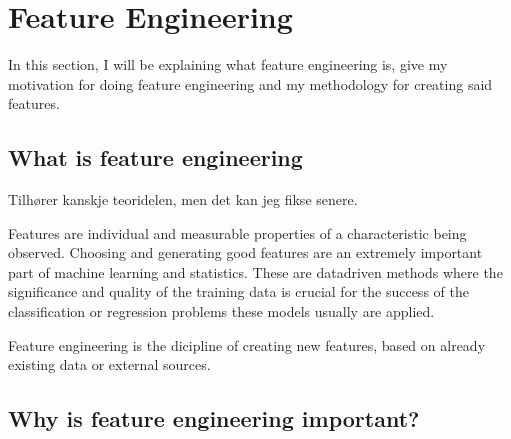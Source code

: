 \chapter[Feature Engineering]{Feature Engineering}
\label{chp:labelkey}
\begin{info}
\end{info}

In this section, I will be explaining what feature engineering is, give my motivation for doing feature engineering and my methodology for creating said features. 
\section{What is feature engineering}
\begin{info}{}
	Tilhører kanskje teoridelen, men det kan jeg fikse senere. 
\end{info}

Features are individual and measurable properties of a characteristic being observed. Choosing and generating good features are an extremely important part of machine learning and statistics. These are datadriven methods where the significance and quality of the training data is crucial for the success of the classification or regression problems these models usually are applied. 

Feature engineering is the dicipline of creating new features, based on already existing data or external sources. 

\section{Why is feature engineering important?}
\begin{info}{}
\end{info}



